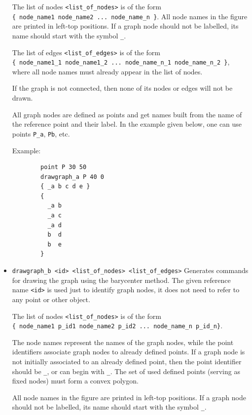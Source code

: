\documentclass[a4paper]{book}
\begin{document}
\begin{itemize}
        The list of nodes \verb|<list_of_nodes>| is of the form \\
        \verb|{ node_name1 node_name2 ... node_name_n }|.
        All node names in the figure are printed in left-top positions.
        If a graph node should not be labelled, its name should start with
        the symbol \verb|_|.

        The list of edges \verb|<list_of_edges>| is of the form \\
        \verb|{ node_name1_1 node_name1_2 ... node_name_n_1 node_name_n_2 }|,
        where all node names must already appear in the list of nodes.

        If the graph is not connected, then none of its nodes or edges
        will not be drawn.

        All graph nodes are defined as {\sc point}s and get names built from
        the name of the reference point and their label. In the example
        given below, one can use points \verb|P_a|, \verb|Pb|, etc.

        Example:

        \begin{verbatim}
        point P 30 50
        drawgraph_a P 40 0
        { _a b c d e }
        {
          _a b
          _a c
          _a d
          b  d
          b  e
        }
        \end{verbatim}

\item \verb|drawgraph_b <id> <list_of_nodes> <list_of_edges>|
        Generates commands for drawing the graph using the barycenter
        method. The given reference name \verb|<id>| is used just to
        identify graph nodes, it does not need to refer to any point or
        other object.

        The list of nodes \verb|<list_of_nodes>| is of the form \\
        \verb|{ node_name1 p_id1 node_name2 p_id2 ... node_name_n p_id_n}|.

        The node names represent the names of the graph nodes, while the
        point identifiers associate graph nodes to already defined points.
        If a graph node is not initially associated to an already
        defined point, then the point identifier should be \verb|_|,
        or can begin with \verb|_|. The set of used defined points
        (serving as fixed nodes) must form a convex polygon.

        All node names in the figure are printed in left-top positions.
        If a graph node should not be labelled, its name should start
        with the symbol \verb|_|.


\end{itemize}
\end{document}
